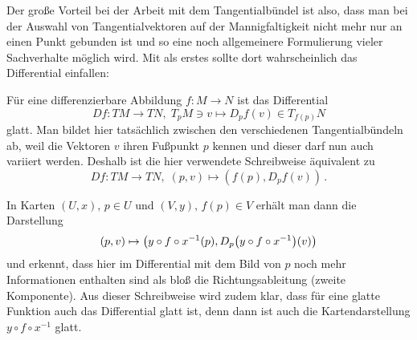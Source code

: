 \documentclass[../H_Analysis_main.tex]{subfiles}
\begin{document}
Der große Vorteil bei der Arbeit mit dem Tangentialbündel ist also, dass man bei der Auswahl von Tangentialvektoren auf der Mannigfaltigkeit nicht mehr nur an einen Punkt gebunden ist und so eine noch allgemeinere Formulierung vieler Sachverhalte möglich wird. Mit als erstes sollte dort wahrscheinlich das Differential einfallen:
\begin{bsp}[Differential]
Für eine differenzierbare Abbildung $f: M \rightarrow N$ ist das Differential
\begin{equation}
Df: TM \rightarrow TN, \; T_p M \ni v \mapsto D_p f(v) \in T_{f(p)} N
\end{equation}
glatt. Man bildet hier tatsächlich zwischen den verschiedenen Tangentialbündeln ab, weil die Vektoren $v$ ihren Fußpunkt $p$ kennen und dieser darf nun auch variiert werden. Deshalb ist die hier verwendete Schreibweise äquivalent zu
\begin{equation*}
Df: TM \rightarrow TN, \; (p, v) \mapsto (f(p), D_p f(v)) \, .
\end{equation*}

In Karten $(U, x), \, p \in U$ und $(V, y), \, f(p) \in V$ erhält man dann die Darstellung
\begin{equation*}
(p, v) \mapsto \qty(y \circ f \circ x^{-1} (p), D_p\qty(y \circ f \circ x^{-1})(v))
\end{equation*}
und erkennt, dass hier im Differential mit dem Bild von $p$ noch mehr Informationen enthalten sind als bloß die Richtungsableitung (zweite Komponente). Aus dieser Schreibweise wird zudem klar, dass für eine glatte Funktion auch das Differential glatt ist, denn dann ist auch die Kartendarstellung $y \circ f \circ x^{-1}$ glatt.
\end{bsp}
\end{document}
